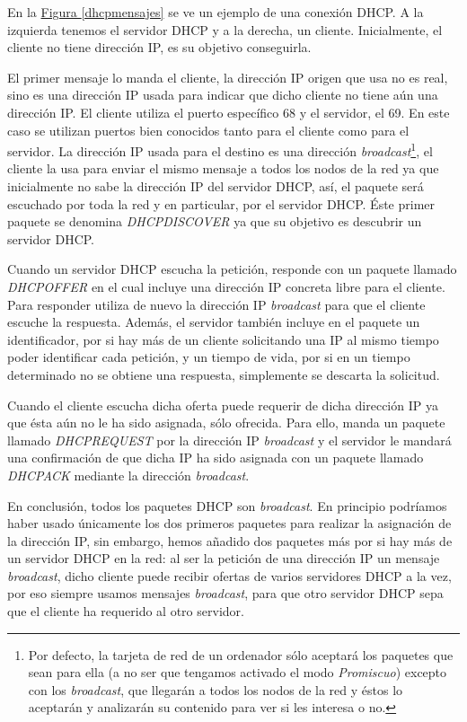 \documentclass[10pt,a4paper,spanish]{report}
\begin{document}
En la \hyperref[dhcpmensajes]{Figura \ref*{dhcpmensajes}} se ve un ejemplo de una conexión DHCP. A la izquierda tenemos el servidor DHCP y a la derecha, un cliente. Inicialmente, el cliente no tiene dirección IP, es su objetivo conseguirla. 

El primer mensaje lo manda el cliente, la dirección IP origen que usa no es real, sino es una dirección IP usada para indicar que dicho cliente no tiene aún una dirección IP. El cliente utiliza el puerto específico 68 y el servidor, el 69. En este caso se utilizan puertos bien conocidos tanto para el cliente como para el servidor. La dirección IP usada para el destino es una dirección \textit{\textcolor{tema2}{broadcast}}\footnote{Por defecto, la tarjeta de red de un ordenador sólo aceptará los paquetes que sean para ella (a no ser que tengamos activado el modo \textit{\textcolor{tema2}{Promiscuo}}) excepto con los \textit{\textcolor{tema2}{broadcast}}, que llegarán a todos los nodos de la red y éstos lo aceptarán y analizarán su contenido para ver si les interesa o no.}, el cliente la usa para enviar el mismo mensaje a todos los nodos de la red ya que inicialmente no sabe la dirección IP del servidor DHCP, así, el paquete será escuchado por toda la red y en particular, por el servidor DHCP. Éste primer paquete se denomina \textit{\textcolor{tema2}{DHCPDISCOVER}} ya que su objetivo es descubrir un servidor DHCP. 

Cuando un servidor DHCP escucha la petición, responde con un paquete llamado \textit{\textcolor{tema2}{DHCPOFFER}} en el cual incluye una dirección IP concreta libre para el cliente. Para responder utiliza de nuevo la dirección IP \textit{\textcolor{tema2}{broadcast}} para que el cliente escuche la respuesta. Además, el servidor también incluye en el paquete un identificador, por si hay más de un cliente solicitando una IP al mismo tiempo poder identificar cada petición, y un tiempo de vida, por si en un tiempo determinado no se obtiene una respuesta, simplemente se descarta la solicitud.

Cuando el cliente escucha dicha oferta puede requerir de dicha dirección IP ya que ésta aún no le ha sido asignada, sólo ofrecida. Para ello, manda un paquete llamado \textit{\textcolor{tema2}{DHCPREQUEST}} por la dirección IP \textcolor{tema2}{\textit{broadcast}} y el servidor le mandará una confirmación de que dicha IP ha sido asignada con un paquete llamado \textit{\textcolor{tema2}{DHCPACK}} mediante la dirección \textit{\textcolor{tema2}{broadcast}}.

En conclusión, todos los paquetes DHCP son \textcolor{tema2}{\textit{broadcast}}. En principio podríamos haber usado únicamente los dos primeros paquetes para realizar la asignación de la dirección IP, sin embargo, hemos añadido dos paquetes más por si hay más de un servidor DHCP en la red: al ser la petición de una dirección IP un mensaje \textit{\textcolor{tema2}{broadcast}}, dicho cliente puede recibir ofertas de varios servidores DHCP a la vez, por eso siempre usamos mensajes \textit{\textcolor{tema2}{broadcast}}, para que otro servidor DHCP sepa que el cliente ha requerido al otro servidor.
\end{document}
